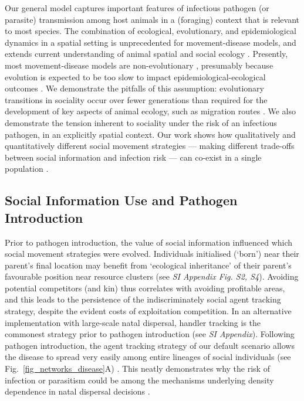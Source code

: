 Our general model captures important features of infectious pathogen (or parasite) transmission among host animals in a (foraging) context that is relevant to most species.
The combination of ecological, evolutionary, and epidemiological dynamics in a spatial setting is unprecedented for movement-disease models, and 
extends current understanding of animal spatial and social ecology \autocite{albery2021,webber2018,webber2022,romano2020,romano2021,kurvers2014}.
Presently, most movement-disease models are non-evolutionary \autocite{white2018,white2017,scherer2020,lunn2021}, presumably because evolution is expected to be too slow to impact epidemiological-ecological outcomes \autocite{monk2022}.
We demonstrate the pitfalls of this assumption: evolutionary transitions in sociality occur over fewer generations than required for the development of key aspects of animal ecology, such as migration routes \autocite{jesmer2018,cantor2021}.
We also demonstrate the tension inherent to sociality under the risk of an infectious pathogen, in an explicitly spatial context.
Our work shows how qualitatively and quantitatively different social movement strategies --- making different trade-offs between social information and infection risk --- can co-exist in a single population \autocite{wolf2012,webber2018,gartland2021,webber2022}.

\subsection*{Social Information Use and Pathogen Introduction}

Prior to pathogen introduction, the value of social information influenced which social movement strategies were evolved. 
Individuals initialised (`born') near their parent's final location may benefit from `ecological inheritance' \autocite{badyaev2009} of their parent's favourable position near resource clusters (see \textit{SI Appendix Fig. S2, S4}).
Avoiding potential competitors (and kin) thus correlates with avoiding profitable areas, and this leads to the persistence of the indiscriminately social agent tracking strategy, despite the evident costs of exploitation competition.
In an alternative implementation with large-scale natal dispersal, handler tracking is the commonest strategy prior to pathogen introduction (see \textit{SI Appendix}).
Following pathogen introduction, the agent tracking strategy of our default scenario allows the disease to spread very easily among entire lineages of social individuals (see Fig.~\ref{fig_networks_disease}A) \autocite{kurvers2014}.
This neatly demonstrates why the risk of infection or parasitism could be among the mechanisms underlying density dependence in natal dispersal decisions \autocite{travis1999}.

